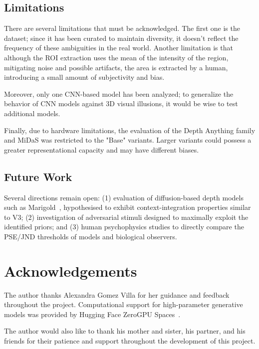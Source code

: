 \documentclass[10pt,twocolumn]{article}
\begin{document}
\subsection*{Limitations}

There are several limitations that must be acknowledged. The first one is the dataset; since it has been curated to maintain diversity, it doesn't reflect the frequency of these ambiguities in the real world. Another limitation is that although the ROI extraction uses the mean of the intensity of the region, mitigating  noise and possible artifacts, the area is extracted by a human, introducing a small amount of subjectivity and bias. \newline

\noindent Moreover, only one CNN-based model has been analyzed; to generalize the behavior of CNN models against 3D visual illusions, it would be wise to test additional models. \newline
 
\noindent Finally, due to hardware limitations, the evaluation of the Depth Anything family and MiDaS was restricted to the "Base" variants. Larger variants could possess a greater representational capacity and may have different biases.

\subsection*{Future Work}

Several directions remain open: (1) evaluation of diffusion-based depth models such as
Marigold~\cite{marigold2024}, hypothesised to exhibit context-integration properties similar to V3; (2) investigation of adversarial stimuli designed to maximally exploit the
identified priors; and (3) human psychophysics studies to directly compare the PSE/JND
thresholds of models and biological observers.

\section*{Acknowledgements}

The author thanks Alexandra Gomez Villa for her guidance and feedback throughout
the project. Computational support for high-parameter generative models was provided
by Hugging Face ZeroGPU Spaces~\cite{zerogpu}.

The author would also like to thank his mother and sister, his partner, and his friends
for their patience and support throughout the development of this project.
\end{document}
